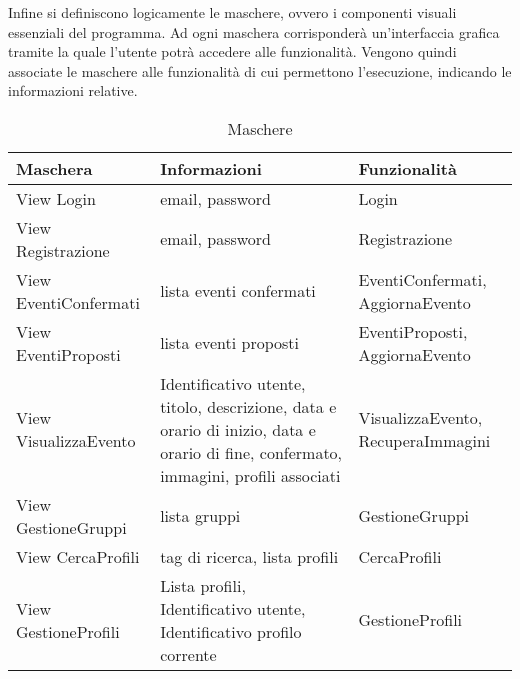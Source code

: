 Infine si definiscono logicamente le maschere, ovvero i componenti visuali essenziali del programma.
Ad ogni maschera corrisponderà un'interfaccia grafica tramite la quale l'utente potrà accedere alle funzionalità.
Vengono quindi associate le maschere alle funzionalità di cui permettono l'esecuzione, indicando le informazioni relative.

\begin{table}[htbp]
    \centering
\begin{tabular} {|P{4.5cm}|P{6.5cm}|P{4cm}|}
    \hline
    \textbf{Maschera}     & \textbf{Informazioni}                                                                                                              & \textbf{Funzionalità}              \\
    \hline
    View Login            & email, password                                                                                                                    & Login                              \\
    \hline
    View Registrazione    & email, password                                                                                                                    & Registrazione                      \\
    \hline
    View EventiConfermati & lista eventi confermati                                                                                                            & EventiConfermati, AggiornaEvento   \\
    \hline
    View EventiProposti   & lista eventi proposti                                                                                                              & EventiProposti, \linebreak AggiornaEvento     \\
    \hline
    View VisualizzaEvento & Identificativo utente, titolo, descrizione, data e orario di inizio, data e orario di fine, confermato, immagini, profili associati & VisualizzaEvento, RecuperaImmagini \\
    \hline
    View GestioneGruppi   & lista gruppi                                                                                                                       & GestioneGruppi                     \\
    \hline
    View CercaProfili     & tag di ricerca, lista profili                                                                                                      & CercaProfili                       \\
    \hline
    View GestioneProfili  & Lista profili, Identificativo utente, Identificativo profilo corrente                                                              & GestioneProfili                    \\
    \hline
\end{tabular}
\caption{Maschere}
\end{table}

